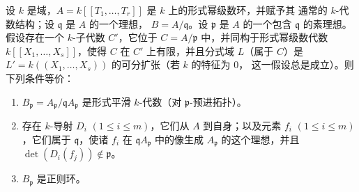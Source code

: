 \begin{proposition}[22.7.2]
\label{0.22.7.2-fr}
设 $k$ 是域，$A=k[[T_1,\ldots,T_r]]$ 是 $k$ 上的形式幂级数环，并赋予其
通常的 $k$-代数结构；设 $\mathfrak q$ 是 $A$ 的一个理想，
$B=A/\mathfrak q$。设 $\mathfrak p$ 是 $A$ 的一个包含
$\mathfrak q$ 的素理想。假设存在一个 $k$-子代数 $C'$，它位于
$C=A/\mathfrak p$ 中，并同构于形式幂级数代数
$k[[X_1,\ldots,X_s]]$，使得 $C$ 在 $C'$ 上有限，并且分式域
$L$（属于 $C$）是 $L'=k((X_1,\ldots,X_s))$ 的可分扩张（若 $k$ 的特征为 0，
这一假设总是成立）。则下列条件等价：
\begin{enumerate}
  \item[a)] $B_{\mathfrak p}=A_{\mathfrak p}/\mathfrak qA_{\mathfrak p}$
  是形式平滑 $k$-代数（对 $\mathfrak p$-预进拓扑）。
  \item[b)] 存在 $k$-导射 $D_i$ $(1\leq i\leq m)$，它们从 $A$
  到自身；以及元素 $f_i$ $(1\leq i\leq m)$，它们属于
  $\mathfrak q$，使诸 $f_i$ 在 $\mathfrak qA_{\mathfrak p}$
  中的像生成 $A_{\mathfrak p}$ 的这个理想，并且
  $\det(D_i(f_j))\notin\mathfrak p$。
  \item[c)] $B_{\mathfrak p}$ 是正则环。
\end{enumerate}
\end{proposition}


